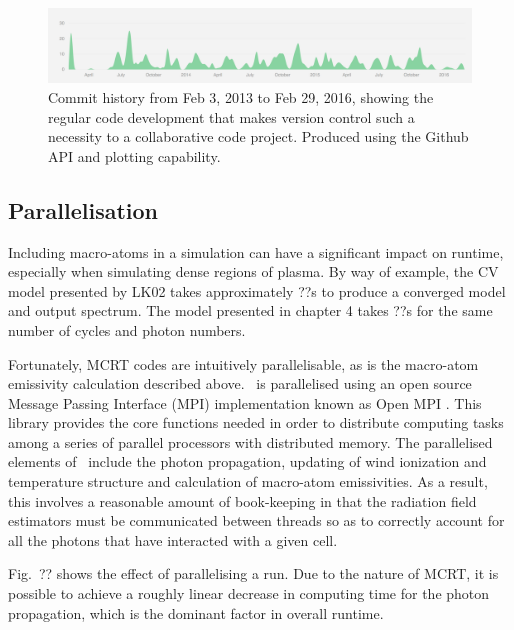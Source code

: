\begin{figure}
\centering
\includegraphics[width=1.0\textwidth]{figures/03-radtrans/github1.png}
\caption
{
Commit history from Feb 3, 2013 to Feb 29, 2016, showing the regular code development
that makes version control such a necessity to a collaborative code project. Produced
using the Github API and plotting capability.
} 
\label{fig:github}
\end{figure}

\subsection{Parallelisation} 

Including macro-atoms in a simulation can have a significant impact 
on runtime, especially when simulating dense regions of plasma. 
By way of example, the CV model presented by LK02 takes approximately
??s to produce a converged model and output spectrum. The model
presented in chapter 4 takes ??s for the same number of cycles and 
photon numbers. 

Fortunately, MCRT codes are intuitively parallelisable, as is the macro-atom
emissivity calculation described above. \py\ is parallelised using an open 
source Message Passing Interface (MPI) implementation known as 
Open MPI \citep{openmpi}. This library provides the core functions needed
in order to distribute computing tasks among a series of parallel processors
with distributed memory. The parallelised elements of \py\ include
the photon propagation, updating of wind ionization and temperature structure
and calculation of macro-atom emissivities. As a result, this involves
a reasonable amount of book-keeping in that the radiation field estimators 
must be communicated between threads so as to correctly account for all
the photons that have interacted with a given cell.

Fig.~?? shows the effect of parallelising a run. Due to the nature of MCRT,
it is possible to achieve a roughly linear decrease in computing time
for the photon propagation, which is the dominant factor in overall 
runtime.




